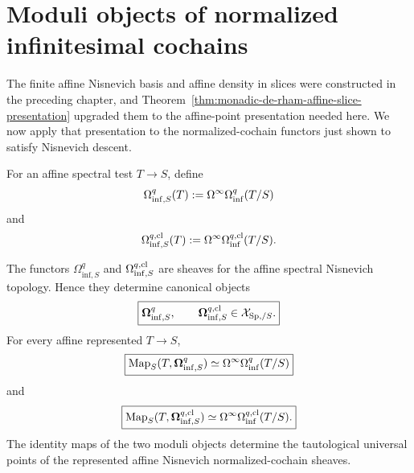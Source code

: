 \section{Moduli objects of normalized infinitesimal cochains}
\label{sec:monadic-de-rham-form-moduli}

The finite affine Nisnevich basis and affine density in slices were constructed in the preceding
chapter, and Theorem~\ref{thm:monadic-de-rham-affine-slice-presentation} upgraded them to the
affine-point presentation needed here.  We now apply that presentation to the normalized-cochain functors just
shown to satisfy Nisnevich descent.

\begin{definition}
\label{def:monadic-de-rham-form-functors}
For an affine spectral test \(T\to S\), define
\[
    \Omega_{\mathrm{inf},S}^q(T)
    :=
    \Omega^\infty\Omega_{\mathrm{inf}}^q(T/S)
\]
and
\[
    \Omega_{\mathrm{inf},S}^{q,\mathrm{cl}}(T)
    :=
    \Omega^\infty\Omega_{\mathrm{inf}}^{q,\mathrm{cl}}(T/S).
\]
\end{definition}

\begin{theorem}
\label{thm:monadic-de-rham-form-moduli}
The functors \(\Omega_{\mathrm{inf},S}^q\) and \(\Omega_{\mathrm{inf},S}^{q,\mathrm{cl}}\) are sheaves for the affine spectral
Nisnevich topology.  Hence they determine canonical objects
\[
\boxed{
    \boldsymbol{\Omega}_{\mathrm{inf},S}^{q},
    \qquad
    \boldsymbol{\Omega}_{\mathrm{inf},S}^{q,\mathrm{cl}}
    \in
    \mathcal X_{\mathrm{Sp},/S}.
}
\]
For every affine represented \(T\to S\),
\[
\boxed{
    \operatorname{Map}_S(T,\boldsymbol{\Omega}_{\mathrm{inf},S}^{q})
    \simeq
    \Omega^\infty\Omega_{\mathrm{inf}}^q(T/S)
}
\]
and
\[
\boxed{
    \operatorname{Map}_S(T,\boldsymbol{\Omega}_{\mathrm{inf},S}^{q,\mathrm{cl}})
    \simeq
    \Omega^\infty\Omega_{\mathrm{inf}}^{q,\mathrm{cl}}(T/S).
}
\]
The identity maps of the two moduli objects determine the tautological universal points of the
represented affine Nisnevich normalized-cochain sheaves.
\end{theorem}

